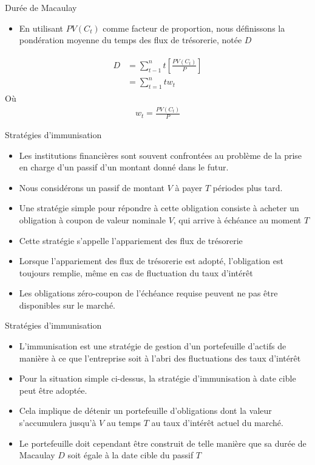 \documentclass{beamer}
\begin{document}
\begin{frame}{Durée de Macaulay}
\begin{itemize}[label=\bullet]
\item En utilisant $PV(C_t)$ comme facteur de proportion, nous définissons la pondération moyenne du temps des flux de trésorerie, notée $D$
\end{itemize}
\begin{align*}
\begin{split}
D & =\sum_{t-1}^n t \left[ \frac{PV(C_t)}{P} \right]\\
&=\sum_{t=1}^n tw_t
\end{split}
\end{align*}
Où 
\begin{align*}
w_t=\frac{PV(C_t)}{P}
\end{align*}
\end{frame}

\begin{frame}{Stratégies d'immunisation}
\begin{itemize}[label=\bullet]
\item Les institutions financières sont souvent confrontées au problème de la prise en charge d'un passif d'un montant donné dans le futur.
\item Nous considérons un passif de montant $V$ à payer $T$ périodes plus tard.
\item Une stratégie simple pour répondre à cette obligation consiste à acheter un obligation à coupon de valeur nominale $V$, qui arrive à échéance au moment $T$
\item Cette stratégie s'appelle l'appariement des flux de trésorerie
\item Lorsque l'appariement des flux de trésorerie est adopté, l'obligation est toujours remplie, même en cas de fluctuation du taux d'intérêt
\item Les obligations zéro-coupon de l'échéance requise peuvent ne pas être disponibles sur le marché.
\end{itemize}
\end{frame}

\begin{frame}{Stratégies d'immunisation}
\begin{itemize}[label=\bullet]
\item L'immunisation est une stratégie de gestion d'un portefeuille d'actifs de manière à ce que l'entreprise soit à l'abri des fluctuations des taux d'intérêt
\item Pour la situation simple ci-dessus, la stratégie d'immunisation à date cible peut être adoptée.
\item Cela implique de détenir un portefeuille d'obligations dont la valeur s'accumulera jusqu'à $V$ au temps $T$ au taux d'intérêt actuel du marché.
\item Le portefeuille doit cependant être construit de telle manière que sa durée de Macaulay $D$ soit égale à la date cible du passif $T$
\end{itemize}

\end{frame}
\end{document}
